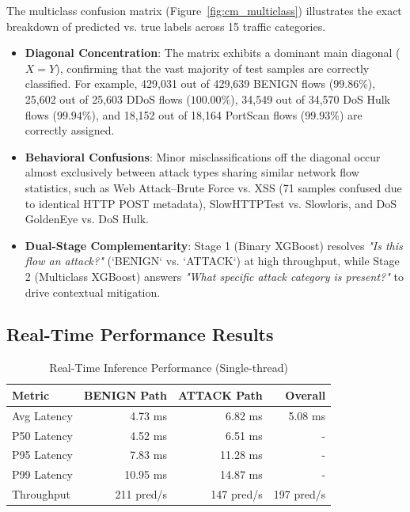 \documentclass[12pt,a4paper]{article}
\begin{document}
The multiclass confusion matrix (Figure~\ref{fig:cm_multiclass}) illustrates the exact breakdown of predicted vs. true labels across 15 traffic categories. 
\begin{itemize}
    \item \textbf{Diagonal Concentration}: The matrix exhibits a dominant main diagonal ($X=Y$), confirming that the vast majority of test samples are correctly classified. For example, 429,031 out of 429,639 BENIGN flows ($99.86\%$), 25,602 out of 25,603 DDoS flows ($100.00\%$), 34,549 out of 34,570 DoS Hulk flows ($99.94\%$), and 18,152 out of 18,164 PortScan flows ($99.93\%$) are correctly assigned.
    \item \textbf{Behavioral Confusions}: Minor misclassifications off the diagonal occur almost exclusively between attack types sharing similar network flow statistics, such as Web Attack--Brute Force vs. XSS (71 samples confused due to identical HTTP POST metadata), SlowHTTPTest vs. Slowloris, and DoS GoldenEye vs. DoS Hulk.
    \item \textbf{Dual-Stage Complementarity}: Stage 1 (Binary XGBoost) resolves \textit{"Is this flow an attack?"} (`BENIGN` vs. `ATTACK`) at high throughput, while Stage 2 (Multiclass XGBoost) answers \textit{"What specific attack category is present?"} to drive contextual mitigation.
\end{itemize}

\subsection{Real-Time Performance Results}

\begin{table}[H]
\centering
\caption{Real-Time Inference Performance (Single-thread)}
\label{tab:runtime_performance}
\begin{tabular}{|l|r|r|r|}
\hline
\textbf{Metric} & \textbf{BENIGN Path} & \textbf{ATTACK Path} & \textbf{Overall} \\
\hline
Avg Latency & 4.73 ms & 6.82 ms & 5.08 ms \\
P50 Latency & 4.52 ms & 6.51 ms & - \\
P95 Latency & 7.83 ms & 11.28 ms & - \\
P99 Latency & 10.95 ms & 14.87 ms & - \\
Throughput & 211 pred/s & 147 pred/s & 197 pred/s \\
\hline
\end{tabular}
\end{table}
\end{document}
